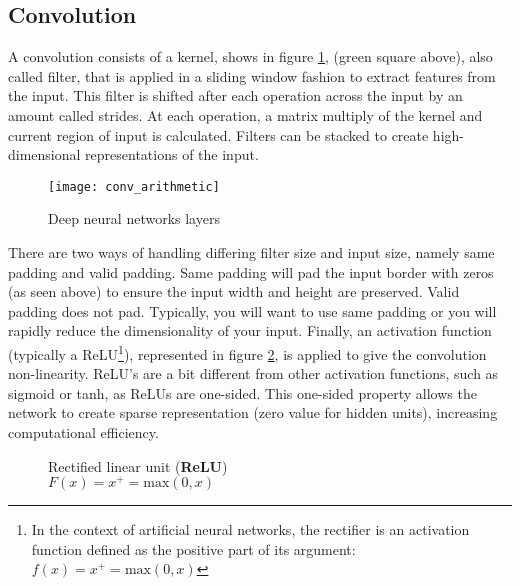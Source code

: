\subsection{Convolution}
\label{ssec:convolution}
%
A convolution consists of a kernel, shows in figure \ref{fig:convolution}, 
(green square above), also called filter,
that is applied in a sliding window fashion to extract features from the input.
This filter is shifted after each operation across the input by an amount called
strides. At each operation, a matrix multiply of the kernel and current region
of input is calculated. Filters can be stacked to create high-dimensional
representations of the input.
%
\begin{figure}[!h]
\centering
\texttt{[image: conv\_arithmetic]}
\caption{Deep neural networks layers}
\label{fig:convolution}
\end{figure}
%
There are two ways of handling differing filter size and input size, namely
same padding and valid padding.
Same padding will pad the input border with zeros (as seen above) to ensure the
input width and height are preserved. Valid padding does not pad.
Typically, you will want to use same padding or you will rapidly reduce the
dimensionality of your input.
Finally, an activation function (typically a ReLU\footnote{In the context of 
artificial neural networks, the rectifier is an activation function defined as 
the positive part of its argument:\\ \(f(x) = x^{+} = \text{max}(0,x)\)}), 
represented in figure \ref{fig:relu}, is applied to give the convolution non-linearity.
ReLU’s are a bit different from other activation functions, such as sigmoid or
tanh, as ReLUs are one-sided.
This one-sided property allows the network to create sparse representation
(zero value for hidden units), increasing computational efficiency.
%
\begin{figure}[htb]
\centering
{}
\caption{Rectified linear unit (\textbf{ReLU})\\ \(F(x) = x^{+} = \text{max}(0,x)\)}
\label{fig:relu}
\end{figure}
%
